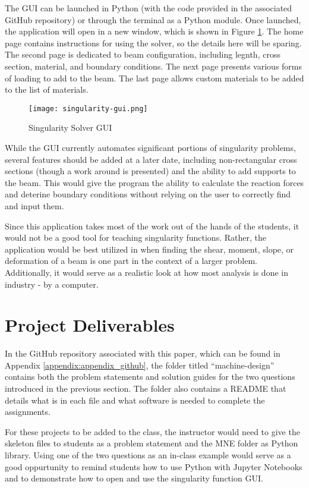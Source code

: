 The GUI can be launched in Python (with the code provided in the associated GitHub repository) or through
the terminal as a Python module. Once launched, the application will open in a new window, which is shown
in Figure \ref{fig:singularity-gui}. The home page contains instructions for using the solver, so the details 
here will be sparing. The second page is dedicated to beam configuration, including legnth, cross section, 
material, and boundary conditions. The next page presents various forms of loading to add
to the beam. The last page allows custom materials to be added to the list of materials.

\begin{figure}[h]
    \texttt{[image: singularity-gui.png]}
    \centering
    \caption{Singularity Solver GUI}
    \centering
    \label{fig:singularity-gui}
\end{figure}

While the GUI currently automates significant portions of singularity problems, several features should be
added at a later date, including non-rectangular cross sections (though a work around is presented) and
the ability to add supports to the beam. This would give the program the ability to calculate the reaction
forces and deterine boundary conditions without relying on the user to correctly find and input them.

Since this application takes most of the work out of the hands of the students, it would not be a good tool
for teaching singularity functions. Rather, the application would be best utilized in when finding the shear,
moment, slope, or deformation of a beam is one part in the context of a larger problem. Additionally, 
it would serve as a realistic look at how most analysis is done in industry - by a computer.

\section{Project Deliverables}

In the GitHub repository associated with this paper, which can be found in Appendix \ref{appendix:appendix_github},
the folder titled ``machine-design'' contains both the problem statements and solution guides for the two questions
introduced in the previous section. The folder also contains a README that details what is in each file and 
what software is needed to complete the assignments. 

For these projects to be added to the class, the instructor would  need to give the skeleton files to 
students as a problem statement and the MNE folder as Python library. Using one of the two questions as an in-class
example would serve as a good oppurtunity to remind students how to use Python with Jupyter Notebooks and to 
demonstrate how to open and use the singularity function GUI.
